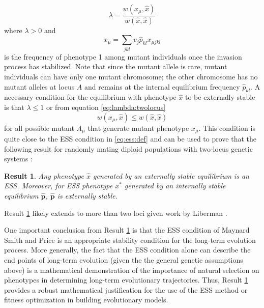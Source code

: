 \documentclass[11pt]{article}
\newcommand{\ess}[1]{#1^*}
\newcommand{\fixp}[1]{\hat{#1}}
\renewcommand{\vec}[1]{\symbf{#1}}
\newcommand{\mut}{\mu}
\newtheorem{result}{Result}
\begin{document}
\begin{equation}
  \label{eq:lambda:twolocus}
  \lambda = \frac{w(x_{\mut}, \fixp{x})}{w(\fixp{x}, \fixp{x})}
\end{equation}
where $\lambda>0$ and
\begin{equation}
  \label{eq:mut:pheno:twolocus}
  x_{\mut} = \sum_{jkl} v_{j} \fixp{p}_{kl} x_{\mut jkl}
\end{equation}
is the frequency of phenotype 1 among mutant individuals once the invasion process has stabilized. Note that since the mutant allele is rare, mutant individuals can have only one mutant chromosome; the other chromosome has no mutant alleles at locus $A$ and remains at the internal equilibrium frequency $\fixp{p}_{kl}$. A necessary condition for the equilibrium with phenotype $\fixp{x}$ to be externally stable is that $\lambda \le 1$ or from equation \eqref{eq:lambda:twolocus}
\begin{equation*}
  w(x_{\mut}, \fixp{x}) \le w(\fixp{x}, \fixp{x})
\end{equation*}
for all possible mutant $A_{\mut}$ that generate mutant phenotype $x_{\mut}$. This condition is quite close to the ESS condition in \eqref{eq:ess:def} and can be used to prove that the following result for randomly mating diploid populations with two-locus genetic systems \cite{Eshel:Feldman:1984,Eshel:1996,Eshel:Feldman:1998}:
\begin{result}
  \label{res:twolocus}
  Any phenotype $\fixp{x}$ generated by an externally stable equilibrium is an ESS. Moreover, for ESS phenotype $\ess{x}$ generated by an internally stable equilibrium $\fixp{\vec{p}}$, $\fixp{\vec{p}}$ is externally stable.
\end{result}
Result \ref{res:twolocus} likely extends to more than two loci given work by Liberman \cite{Liberman:1988}.

One important conclusion from Result \ref{res:twolocus} is that the ESS condition of Maynard Smith and Price \cite{Maynard-Smith:Price:1973,Maynard-Smith:1974} is an appropriate stability condition for the long-term evolution process. More generally, the fact that the ESS condition alone can describe the end points of long-term evolution (given the the general genetic assumptions above) is a mathematical demonstration of the importance of natural selection on phenotypes in determining long-term evolutionary trajectories. Thus, Result \ref{res:twolocus} provides a robust mathematical justification for the use of the ESS method or fitness optimization in building evolutionary models.
\end{document}
